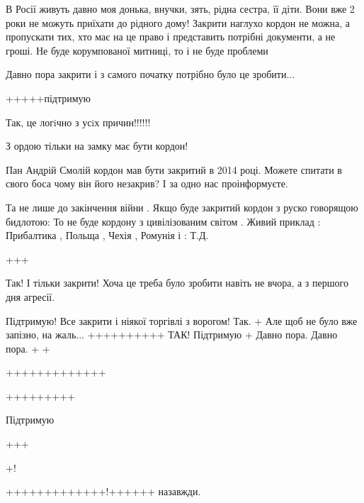\begin{itemize}

В Росії живуть давно моя донька, внучки, зять, рідна сестра, її діти. Вони вже
2 роки не можуть приїхати до рідного дому! Закрити наглухо кордон не можна, а
пропускати тих, хто має на це право і представить потрібні документи, а не
гроші. Не буде корумпованої митниці, то і не буде проблеми


Давно пора закрити і з самого початку потрібно було це зробити...

+++++підтримую

Так, це логiчно з усiх причин!!!!!!

З ордою тільки на замку має бути кордон!


Пан Андрій Смолій кордон мав бути закритий в 2014 році.  Можете спитати в свого
боса чому він його незакрив? І за одно нас проінформуєте.


Та не лише до закінчення війни . Якщо буде закритий кордон з руско говорящою
бидлотою: То не буде кордону з цивілізованим світом . Живий приклад :
Прибалтика , Польща , Чехія , Ромунія і : Т.Д.

+++


Так!  І тільки закрити!  Хоча це треба було зробити навіть не вчора, а з
першого дня агресії.

Підтримую!
Все закрити і ніякої торгівлі з ворогом!
Так. +
Але щоб не було вже запізно, на жаль...
++++++++++
ТАК!
Підтримую
+
Давно пора.
Давно пора.
+
+

+++++++++++++

+++++++++

Підтримую

+++

+!

+++++++++++++!++++++ назавжди.
\end{itemize}
